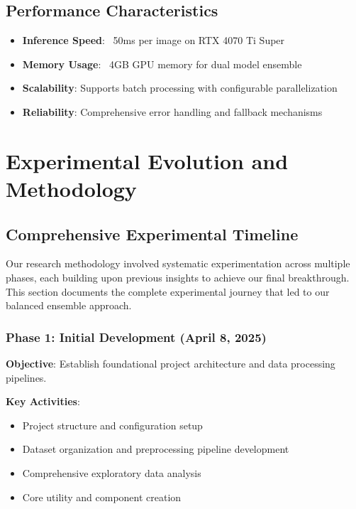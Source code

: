 \documentclass[12pt,twocolumn]{article}
\begin{document}
\subsection{Performance Characteristics}

\begin{itemize}[itemsep=1pt,parsep=0pt,topsep=3pt]
\item \textbf{Inference Speed}: ~50ms per image on RTX 4070 Ti Super
\item \textbf{Memory Usage}: ~4GB GPU memory for dual model ensemble
\item \textbf{Scalability}: Supports batch processing with configurable parallelization
\item \textbf{Reliability}: Comprehensive error handling and fallback mechanisms
\end{itemize}

\section{Experimental Evolution and Methodology}

\subsection{Comprehensive Experimental Timeline}

Our research methodology involved systematic experimentation across multiple phases, each building upon previous insights to achieve our final breakthrough. This section documents the complete experimental journey that led to our balanced ensemble approach.

\subsubsection{Phase 1: Initial Development (April 8, 2025)}

\textbf{Objective}: Establish foundational project architecture and data processing pipelines.

\textbf{Key Activities}:
\begin{itemize}[itemsep=1pt,parsep=0pt,topsep=2pt]
\item Project structure and configuration setup
\item Dataset organization and preprocessing pipeline development
\item Comprehensive exploratory data analysis
\item Core utility and component creation
\end{itemize}
\end{document}
